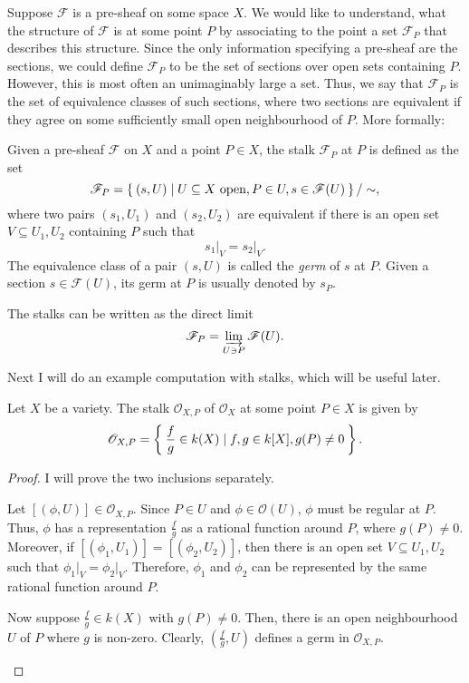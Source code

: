 Suppose $\mathscr{F}$ is a pre-sheaf on some space $X$.
We would like to understand, what the structure of $\mathscr{F}$
is at some point $P$ by associating to the point a set $\mathscr{F}_P$ that describes this structure.
Since the only information specifying a pre-sheaf are the sections, we could define $\mathscr{F}_P$ to be
the set of sections over open sets containing $P$. However,
this is most often an unimaginably large a set. Thus,
we say that $\mathscr{F}_P$ is the set of equivalence classes
of such sections, where two sections are equivalent if they
agree on some sufficiently small open neighbourhood of $P$.
More formally:
\begin{defin}
  Given a pre-sheaf $\mathscr{F}$ on $X$ and a point $P\in X$, the stalk
  $\mathscr{F}_{P}$ at $P$ is defined as the set
  \[
    \mathscr{F}_{P}=\Set{(s, U)\mid U\subseteq X\text{ open}, P\in U, s\in
    \mathscr{F}(U)}/\sim,
  \]
  where two pairs $(s_{1}, U_{1})$ and $(s_{2}, U_{2})$ are equivalent
  if there is an open set $V\subseteq U_{1}, U_{2}$ containing $P$ such that
  \[
    s_{1}\vert_{V}=s_{2}\vert_{V}.
  \]
  The equivalence class of a pair $(s, U)$ is called the \emph{germ}
  of $s$ at $P$. Given a section $s\in\mathscr{F}(U)$, its germ at $P$
  is usually denoted by $s_{P}$.
\end{defin}
\begin{cat}
  The stalks can be written as the direct limit
  \[\mathscr{F}_{P}=\varinjlim_{U\ni P}\mathscr{F}(U).\]
\end{cat}
Next I will do an example computation with stalks, which will be useful
later.
\begin{prop}\label{prop:struct_stalk}
  Let $X$ be a variety. The stalk $\mathscr{O}_{X,P}$ of
  $\mathscr{O}_{X}$ at some point $P\in X$ is given by
  \[
    \mathscr{O}_{X,P}=\Set{\frac{f}g\in k(X)\mid f,g\in k[X],g(P)\neq 0}.
  \]
\end{prop}
\begin{proof}
  I will prove the two inclusions separately.
  \begin{description}[style=nextline]
    \item[$\subseteq\big)$]
          Let $[(\phi, U)]\in \mathscr{O}_{X,P}$. Since $P\in U$ and
          $\phi\in \mathscr{O}(U)$, $\phi$ must be regular at $P$. Thus,
          $\phi$ has a representation $\frac{f}g$ as a rational function
          around $P$, where $g(P)\neq 0$. Moreover, if $[(\phi_{1}, U_{1})]
          =[(\phi_{2}, U_{2})]$, then there is an open set $V\subseteq
          U_{1},U_{2}$ such that $\phi_{1}\vert_{V}=\phi_{2}\vert_{V}$.
          Therefore, $\phi_{1}$ and $\phi_{2}$ can be represented by the
          same rational function around $P$.
    \item[$\supseteq\big)$]
          Now suppose $\frac{f}g\in k(X)$ with $g(P)\neq 0$. Then, there
          is an open neighbourhood $U$ of $P$ where $g$ is non-zero.
          Clearly, $(\frac{f}g, U)$ defines a germ in $\mathscr{O}_{X,P}$.
  \end{description}
\end{proof}

